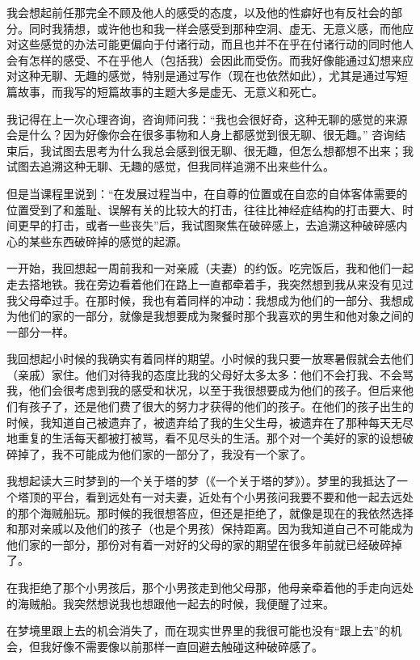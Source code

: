 我会想起前任那完全不顾及他人的感受的态度，以及他的性癖好也有反社会的部分。同时我猜想，或许他也和我一样会感受到那种空洞、虚无、无意义感，而他应对这些感觉的办法可能更偏向于付诸行动，而且也并不在乎在付诸行动的同时他人会有怎样的感受、不在乎他人（包括我）会因此而受伤。而我好像能通过幻想来应对这种无聊、无趣的感觉，特别是通过写作（现在也依然如此），尤其是通过写短篇故事，而我写的短篇故事的主题大多是虚无、无意义和死亡。

我记得在上一次心理咨询，咨询师问我：“我也会很好奇，这种无聊的感觉的来源会是什么？因为好像你会在很多事物和人身上都感觉到很无聊、很无趣。” 咨询结束后，我试图去思考为什么我总会感到很无聊、很无趣，但怎么想都想不出来；我试图去追溯这种无聊、无趣的感觉，但我同样追溯不出来些什么。

但是当课程里说到：“在发展过程当中，在自尊的位置或在自恋的自体客体需要的位置受到了和羞耻、误解有关的比较大的打击，往往比神经症结构的打击要大、时间更早的打击，或者一些丧失”后，我试图聚焦在破碎感上，去追溯这种破碎感\pozhehao{}内心的某些东西破碎掉的感觉的起源。

一开始，我回想起一周前我和一对亲戚（夫妻）的约饭。吃完饭后，我和他们一起走去搭地铁。我在旁边看着他们在路上一直都牵着手，我突然想到我从来没有见过我父母牵过手。在那时候，我也有着同样的冲动：我想成为他们的一部分、我想成为他们的家的一部分，就像是我想要成为聚餐时那个我喜欢的男生和他对象之间的一部分一样。

我回想起小时候的我确实有着同样的期望。小时候的我只要一放寒暑假就会去他们（亲戚）家住。他们对待我的态度比我的父母好太多太多：他们不会打我、不会骂我，他们会很考虑到我的感受和状况，以至于我很想要成为他们的孩子。但后来他们有孩子了，还是他们费了很大的努力才获得的他们的孩子。在他们的孩子出生的时候，我知道自己被遗弃了，被遗弃给了我的生父生母，被遗弃在了那种每天无尽地重复的生活\pozhehao{}每天都被打被骂，看不见尽头的生活。那个对一个美好的家的设想破碎掉了，我不可能成为他们家的一部分了，我没有一个家了。

我想起读大三时梦到的一个关于塔的梦（《一个关于塔的梦》）。梦里的我抵达了一个塔顶的平台，看到远处有一对夫妻，近处有个小男孩问我要不要和他一起去远处的那个海贼船玩。那时候的我很想答应，但还是拒绝了，就像是现在的我依然选择和那对亲戚以及他们的孩子（也是个男孩）保持距离。因为我知道自己不可能成为他们家的一部分，那份对有着一对好的父母的家的期望在很多年前就已经破碎掉了。

在我拒绝了那个小男孩后，那个小男孩走到他父母那，他母亲牵着他的手走向远处的海贼船。我突然想说我也想跟他一起去的时候，我便醒了过来。

在梦境里跟上去的机会消失了，而在现实世界里的我很可能也没有“跟上去”的机会，但我好像不需要像以前那样一直回避去触碰这种破碎感了。

